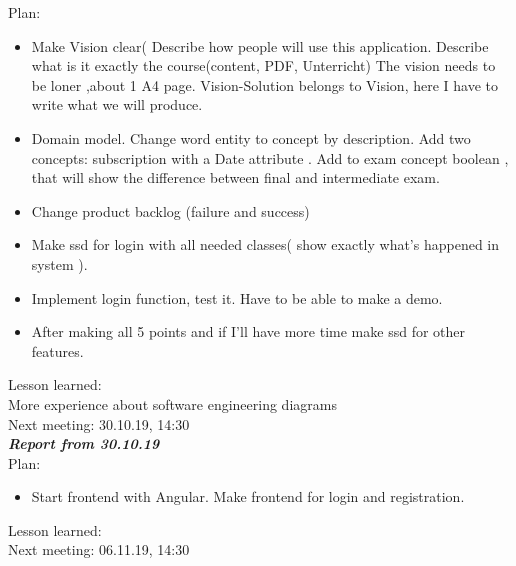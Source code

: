 \documentclass{scrartcl}
\begin{document}
Plan:
\begin{itemize}


 
	\item	Make Vision clear( Describe how people will use this application. Describe what is it exactly the course(content, PDF, Unterricht) The vision needs to be loner ,about 1 A4 page.
Vision-Solution belongs to Vision, here I have to write what we will produce.
	\item	Domain model. Change word entity to concept by description.
Add two concepts: subscription with a Date attribute .
Add to exam concept boolean , that will show the difference between final and intermediate exam.
	\item	Change product backlog (failure and success) 
	\item	Make ssd for login with all needed classes( show exactly what’s happened in system ). 
	\item	Implement login function, test it. Have to be able to make a demo.
	\item	After making all 5 points and if I’ll have more time make ssd for other features.
	\end{itemize}
Lesson learned: \\
More experience about software engineering diagrams\\
Next meeting: 30.10.19, 14:30\\


\textbf{\textit{Report from 30.10.19}}\\
Plan:\\
\begin{itemize}


	\item	Start frontend with Angular. Make frontend for login and registration.
	\end{itemize}
Lesson learned:\\

Next meeting: 06.11.19, 14:30\\
\end{document}
